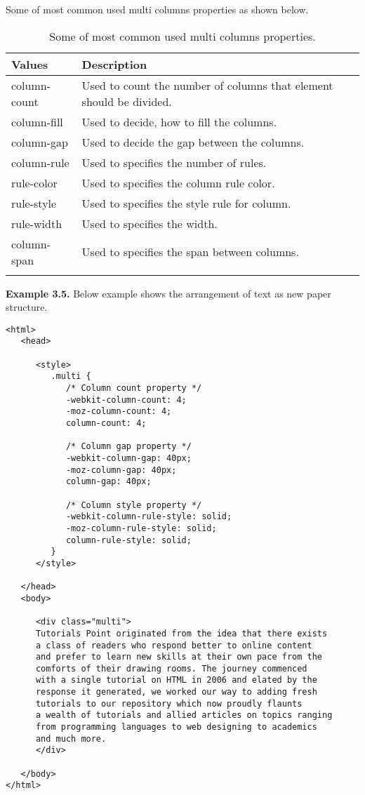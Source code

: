\documentclass[a4paper,oneside]{book}
\numberwithin{equation}{chapter}
\begin{document}
Some of most common used multi columns properties as shown below.
\begin{center}
\begin{longtable}{|l|p{9cm}|}
\hline
\textbf{Values} & \textbf{Description}\\
\hline
column-count & Used to count the number of columns that element should be divided.\\
\hline
column-fill & Used to decide, how to fill the columns.\\
\hline
column-gap & Used to decide the gap between the columns.\\
\hline
column-rule & Used to specifies the number of rules.\\
\hline
rule-color & Used to specifies the column rule color.\\
\hline
rule-style & Used to specifies the style rule for column.\\
\hline
rule-width & Used to specifies the width.\\
\hline
column-span & Used to specifies the span between columns.\\
\hline
\caption{Some of most common used multi columns properties.}
\end{longtable}
\end{center}
\textbf{Example 3.5.} Below example shows the arrangement of text as new paper structure.
\begin{verbatim}
<html>
   <head>
   
      <style>
         .multi {
            /* Column count property */
            -webkit-column-count: 4;
            -moz-column-count: 4;
            column-count: 4;
            
            /* Column gap property */
            -webkit-column-gap: 40px; 
            -moz-column-gap: 40px; 
            column-gap: 40px;
            
            /* Column style property */
            -webkit-column-rule-style: solid; 
            -moz-column-rule-style: solid; 
            column-rule-style: solid;
         }
      </style>
      
   </head>
   <body>
   
      <div class="multi">
      Tutorials Point originated from the idea that there exists 
      a class of readers who respond better to online content 
      and prefer to learn new skills at their own pace from the 
      comforts of their drawing rooms. The journey commenced 
      with a single tutorial on HTML in 2006 and elated by the 
      response it generated, we worked our way to adding fresh 
      tutorials to our repository which now proudly flaunts 
      a wealth of tutorials and allied articles on topics ranging 
      from programming languages to web designing to academics 
      and much more.
      </div>
      
   </body>
</html>
\end{verbatim}
\end{document}
